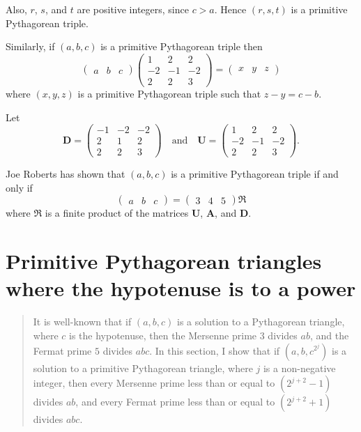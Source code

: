 \documentclass{article}
\theoremstyle{definition}
\begin{document}
Also, \(r\), \(s\), and \(t\) are positive integers, since \(c>a\). Hence \((r,s,t)\) is a primitive Pythagorean triple.

Similarly, if \((a,b,c)\) is a primitive Pythagorean triple then \[ \begin{pmatrix} a&b&c \end{pmatrix} \begin{pmatrix} 1&2&2 \\ -2&-1&-2 \\ 2&2&3 \end{pmatrix} = \begin{pmatrix}x&y&z \end{pmatrix} \] where \((x,y,z)\) is a primitive Pythagorean triple such that \(z-y = c-b\).

Let \[ \mathbf{D} = \begin{pmatrix} -1&-2&-2 \\ 2&1&2 \\ 2&2&3 \end{pmatrix} \quad\text{and}\quad \mathbf{U} = \begin{pmatrix} 1&2&2 \\ -2&-1&-2 \\ 2&2&3 \end{pmatrix}. \]

Joe Roberts\textsuperscript{\cite{jr}} has shown that \((a, b, c)\) is a primitive Pythagorean triple if and only if \[ \begin{pmatrix} a & b & c \end{pmatrix} = \begin{pmatrix} 3 & 4 & 5 \end{pmatrix} \mathfrak{R} \] where \(\mathfrak{R}\) is a finite product of the matrices \(\textbf{U}\), \(\textbf{A}\), and \(\textbf{D}\).

\section{Primitive Pythagorean triangles where the hypotenuse is to a power}

\begin{quote}
\textsf{It is well-known that if \((a,b,c)\) is a solution to a Pythagorean triangle, where \(c\) is the hypotenuse, then the Mersenne prime \(3\) divides \(ab\), and the Fermat prime \(5\) divides \(abc\). In this section, I show that if \((a,b,c^{2^j})\) is a solution to a primitive Pythagorean triangle, where \(j\) is a non-negative integer, then every Mersenne prime less than or equal to \((2^{j+2}-1)\) divides \(ab\), and every Fermat prime less than or equal to \((2^{j+2}+1)\) divides \(abc\).}
\end{quote}
\end{document}
